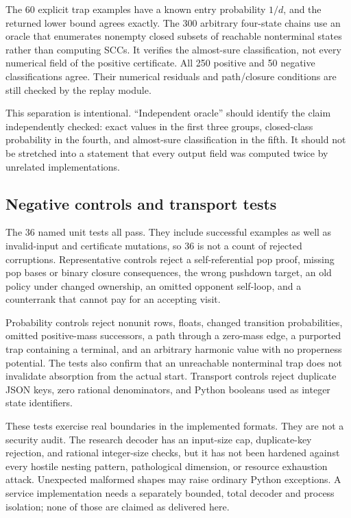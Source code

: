 The 60 explicit trap examples have a known entry probability $1/d$, and the
returned lower bound agrees exactly. The 300 arbitrary four-state chains use
an oracle that enumerates nonempty closed subsets of reachable nonterminal
states rather than computing SCCs. It verifies the almost-sure classification,
not every numerical field of the positive certificate. All 250 positive and
50 negative classifications agree. Their numerical residuals and path/closure
conditions are still checked by the replay module.

This separation is intentional. ``Independent oracle'' should identify the
claim independently checked: exact values in the first three groups,
closed-class probability in the fourth, and almost-sure classification in the
fifth. It should not be stretched into a statement that every output field was
computed twice by unrelated implementations.

\subsection{Negative controls and transport tests}
The 36 named unit tests all pass. They include successful examples as well as
invalid-input and certificate mutations, so 36 is not a count of rejected
corruptions. Representative controls reject a self-referential pop proof,
missing pop bases or binary closure consequences, the wrong pushdown target,
an old policy under changed ownership, an omitted opponent self-loop, and a
counterrank that cannot pay for an accepting visit.

Probability controls reject nonunit rows, floats, changed transition
probabilities, omitted positive-mass successors, a path through a zero-mass
edge, a purported trap containing a terminal, and an arbitrary harmonic value
with no properness potential. The tests also confirm that an unreachable
nonterminal trap does not invalidate absorption from the actual start.
Transport controls reject duplicate JSON keys, zero rational denominators, and
Python booleans used as integer state identifiers.

These tests exercise real boundaries in the implemented formats. They are not
a security audit. The research decoder has an input-size cap, duplicate-key
rejection, and rational integer-size checks, but it has not been hardened
against every hostile nesting pattern, pathological dimension, or resource
exhaustion attack. Unexpected malformed shapes may raise ordinary Python
exceptions. A service implementation needs a separately bounded, total decoder
and process isolation; none of those are claimed as delivered here.

